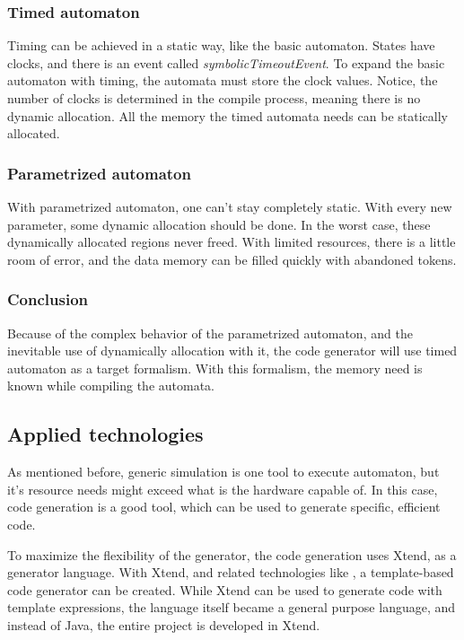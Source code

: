 \subsubsection{Timed automaton}

Timing can be achieved in a static way, like the basic automaton. States have clocks, and there is an event called \emph{symbolicTimeoutEvent}. To expand the basic automaton with timing, the automata must store the clock values. Notice, the number of clocks is determined in the compile process, meaning there is no dynamic allocation. All the memory the timed automata needs can be statically allocated.

\subsubsection{Parametrized automaton}

With parametrized automaton, one can't stay completely static. With every new parameter, some dynamic allocation should be done. In the worst case, these dynamically allocated regions never freed. With limited resources, there is a little room of error, and the data memory can be filled quickly with abandoned tokens.

\subsubsection{Conclusion}

Because of the complex behavior of the parametrized automaton, and the inevitable use of dynamically allocation with it, the code generator will use timed automaton as a target formalism. With this formalism, the memory need is known while compiling the automata.

\subsection{Applied technologies}

As mentioned before, generic simulation is one tool to execute automaton, but it's resource needs might exceed what is the hardware capable of. In this case, \mtc{} code generation is a good tool, which can be used to generate specific, efficient code.

To maximize the flexibility of the generator, the code generation uses Xtend, as a generator language. With Xtend, and related technologies like \viatraq{}, a template-based code generator can be created. While Xtend can be used to generate code with template expressions, the language itself became a general purpose language, and instead of Java, the entire project is developed in Xtend.

